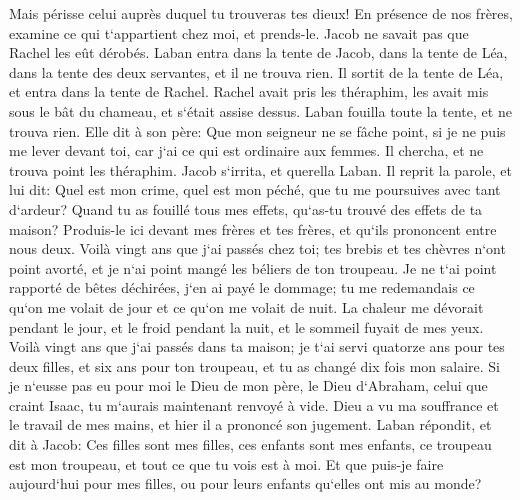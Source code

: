 \verse Mais périsse celui auprès duquel tu trouveras tes dieux! En présence de nos frères, examine ce qui t`appartient chez moi, et prends-le. Jacob ne savait pas que Rachel les eût dérobés. 
\verse Laban entra dans la tente de Jacob, dans la tente de Léa, dans la tente des deux servantes, et il ne trouva rien. Il sortit de la tente de Léa, et entra dans la tente de Rachel. 
\verse Rachel avait pris les théraphim, les avait mis sous le bât du chameau, et s`était assise dessus. Laban fouilla toute la tente, et ne trouva rien. 
\verse Elle dit à son père: Que mon seigneur ne se fâche point, si je ne puis me lever devant toi, car j`ai ce qui est ordinaire aux femmes. Il chercha, et ne trouva point les théraphim. 
\verse Jacob s`irrita, et querella Laban. Il reprit la parole, et lui dit: Quel est mon crime, quel est mon péché, que tu me poursuives avec tant d`ardeur? 
\verse Quand tu as fouillé tous mes effets, qu`as-tu trouvé des effets de ta maison? Produis-le ici devant mes frères et tes frères, et qu`ils prononcent entre nous deux. 
\verse Voilà vingt ans que j`ai passés chez toi; tes brebis et tes chèvres n`ont point avorté, et je n`ai point mangé les béliers de ton troupeau. 
\verse Je ne t`ai point rapporté de bêtes déchirées, j`en ai payé le dommage; tu me redemandais ce qu`on me volait de jour et ce qu`on me volait de nuit. 
\verse La chaleur me dévorait pendant le jour, et le froid pendant la nuit, et le sommeil fuyait de mes yeux. 
\verse Voilà vingt ans que j`ai passés dans ta maison; je t`ai servi quatorze ans pour tes deux filles, et six ans pour ton troupeau, et tu as changé dix fois mon salaire. 
\verse Si je n`eusse pas eu pour moi le Dieu de mon père, le Dieu d`Abraham, celui que craint Isaac, tu m`aurais maintenant renvoyé à vide. Dieu a vu ma souffrance et le travail de mes mains, et hier il a prononcé son jugement. 
\verse Laban répondit, et dit à Jacob: Ces filles sont mes filles, ces enfants sont mes enfants, ce troupeau est mon troupeau, et tout ce que tu vois est à moi. Et que puis-je faire aujourd`hui pour mes filles, ou pour leurs enfants qu`elles ont mis au monde? 
